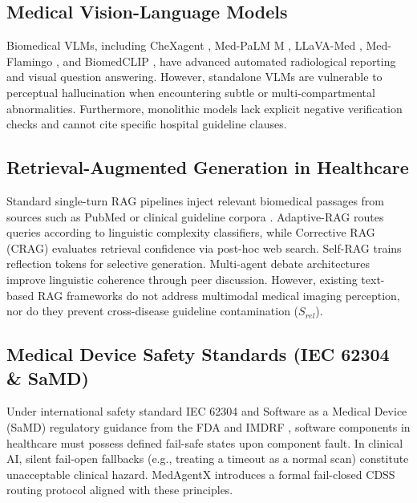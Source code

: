 \documentclass[journal,10pt,twocolumn]{IEEEtran}
\begin{document}
\subsection{Medical Vision-Language Models}
Biomedical VLMs, including CheXagent \cite{chen2024chexagent}, Med-PaLM M \cite{tu2024medpalmm}, LLaVA-Med \cite{li2023llavamed}, Med-Flamingo \cite{moor2023medflamingo}, and BiomedCLIP \cite{zhang2023biomedclip}, have advanced automated radiological reporting and visual question answering. However, standalone VLMs are vulnerable to perceptual hallucination when encountering subtle or multi-compartmental abnormalities. Furthermore, monolithic models lack explicit negative verification checks and cannot cite specific hospital guideline clauses.

\subsection{Retrieval-Augmented Generation in Healthcare}
Standard single-turn RAG pipelines inject relevant biomedical passages from sources such as PubMed \cite{sayers2021pubmed,jin2019pubmedqa} or clinical guideline corpora \cite{xiong2024benchmarking,zakka2024almanac}. Adaptive-RAG \cite{jeong2024adaptiverag} routes queries according to linguistic complexity classifiers, while Corrective RAG (CRAG) \cite{yan2024crag} evaluates retrieval confidence via post-hoc web search. Self-RAG \cite{asai2024selfrag} trains reflection tokens for selective generation. Multi-agent debate architectures \cite{du2024improving,wu2023autogen} improve linguistic coherence through peer discussion. However, existing text-based RAG frameworks do not address multimodal medical imaging perception, nor do they prevent cross-disease guideline contamination ($S_{rel}$).

\subsection{Medical Device Safety Standards (IEC 62304 \& SaMD)}
Under international safety standard IEC 62304 \cite{iec62304} and Software as a Medical Device (SaMD) regulatory guidance from the FDA \cite{fda2017samd} and IMDRF \cite{imdrf2014samd}, software components in healthcare must possess defined fail-safe states upon component fault. In clinical AI, silent fail-open fallbacks (e.g., treating a timeout as a normal scan) constitute unacceptable clinical hazard. MedAgentX introduces a formal fail-closed CDSS routing protocol aligned with these principles.
\end{document}
